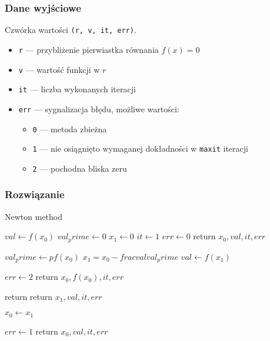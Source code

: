 \documentclass{article}
\begin{document}
\subsubsection*{Dane wyjściowe}
	Czwórka wartości \texttt{(r, v, it, err)}.
	\begin{itemize}
	    \item \texttt{r} — przybliżenie pierwiastka równania $f(x) = 0$
	    \item \texttt{v} — wartość funkcji w $r$
	    \item \texttt{it} — liczba wykonanych iteracji
	    \item \texttt{err} — sygnalizacja błędu, możliwe wartości:
	    \begin{itemize}
	        \item \texttt{0} — metoda zbieżna
	        \item \texttt{1} — nie osiągnięto wymaganej dokładności w \texttt{maxit} iteracji
	        \item \texttt{2} — pochodna bliska zeru
	    \end{itemize}
	\end{itemize}
\subsubsection*{Rozwiązanie}
	\begin{algorithm}[H]
	\caption{Newton method}
	\begin{algorithmic}
		\State $val \gets f(x_0)$
        \State $val_prime \gets 0$
        \State $x_1 \gets 0$
        \State $it \gets 1$
        	\State $err \gets 0$
        	\State return $x_0, val, it, err$
        \EndIf

        	\State $val_prime \gets pf(x_0)$
        	\State $x_1 = x_0 - frac{val}{val_prime}$
        	\State $val \gets f(x_1)$

        		\State $err \gets 2$
        		\State return $x_0, f(x_0), it, err$
        	\EndIf

        		\State return return $x_1, val, it, err$
        	\EndIf

        	\State $x_0 \gets x_1$
        \EndFor

        \State $err \gets 1$
        \State return $x_0, val, it, err$
    \end{algorithmic}
    \end{algorithm}
\clearpage
\end{document}
